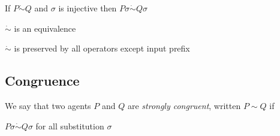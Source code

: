 \begin{proposition}
  If $P \dot{\sim} Q$ and $\sigma$ is injective then $P\sigma \dot{\sim} Q\sigma$
% 	
\end{proposition}

\begin{proposition}
  $\dot{\sim}$ is an equivalence
\end{proposition}

\begin{proposition}
  $\dot{\sim}$ is preserved by all operators except input prefix
\end{proposition}


\subsection{Congruence}

\begin{definition}
  We say that two agents $P$ and $Q$ are \emph{strongly congruent}, written $P\sim Q$ if
  \begin{center}
    $P\sigma \dot{\sim} Q\sigma$ for all substitution $\sigma$    
  \end{center}
\end{definition}

